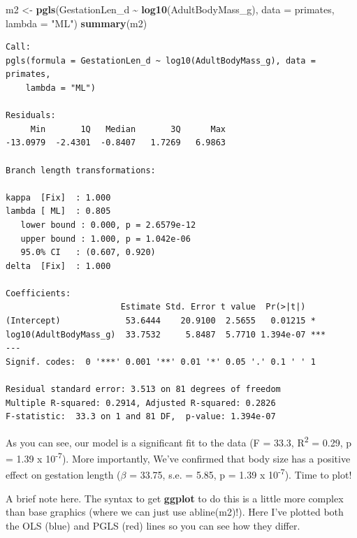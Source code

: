 \documentclass[
]{book}
\newenvironment{Shaded}{\begin{snugshade}}{\end{snugshade}}
\newcommand{\DataTypeTok}[1]{\textcolor[rgb]{0.13,0.29,0.53}{#1}}
\newcommand{\KeywordTok}[1]{\textcolor[rgb]{0.13,0.29,0.53}{\textbf{#1}}}
\newcommand{\NormalTok}[1]{#1}
\newcommand{\OperatorTok}[1]{\textcolor[rgb]{0.81,0.36,0.00}{\textbf{#1}}}
\newcommand{\StringTok}[1]{\textcolor[rgb]{0.31,0.60,0.02}{#1}}
\begin{document}
\begin{Shaded}
\begin{Highlighting}[]
\NormalTok{m2 \textless{}{-}}\StringTok{ }\KeywordTok{pgls}\NormalTok{(GestationLen\_d }\OperatorTok{\textasciitilde{}}\StringTok{ }\KeywordTok{log10}\NormalTok{(AdultBodyMass\_g), }\DataTypeTok{data =}\NormalTok{ primates, }\DataTypeTok{lambda =} \StringTok{"ML"}\NormalTok{)}
\KeywordTok{summary}\NormalTok{(m2)}
\end{Highlighting}
\end{Shaded}

\begin{verbatim}
Call:
pgls(formula = GestationLen_d ~ log10(AdultBodyMass_g), data = primates, 
    lambda = "ML")

Residuals:
     Min       1Q   Median       3Q      Max 
-13.0979  -2.4301  -0.8407   1.7269   6.9863 

Branch length transformations:

kappa  [Fix]  : 1.000
lambda [ ML]  : 0.805
   lower bound : 0.000, p = 2.6579e-12
   upper bound : 1.000, p = 1.042e-06
   95.0% CI   : (0.607, 0.920)
delta  [Fix]  : 1.000

Coefficients:
                       Estimate Std. Error t value  Pr(>|t|)    
(Intercept)             53.6444    20.9100  2.5655   0.01215 *  
log10(AdultBodyMass_g)  33.7532     5.8487  5.7710 1.394e-07 ***
---
Signif. codes:  0 '***' 0.001 '**' 0.01 '*' 0.05 '.' 0.1 ' ' 1

Residual standard error: 3.513 on 81 degrees of freedom
Multiple R-squared: 0.2914, Adjusted R-squared: 0.2826 
F-statistic:  33.3 on 1 and 81 DF,  p-value: 1.394e-07 
\end{verbatim}

As you can see, our model is a significant fit to the data (F = 33.3, R\textsuperscript{2} = 0.29, p = 1.39 x 10\textsuperscript{-7}). More importantly, We've confirmed that body size has a positive effect on gestation length (\(\beta\) = 33.75, s.e. = 5.85, p = 1.39 x 10\textsuperscript{-7}). Time to plot!

A brief note here. The syntax to get \textbf{ggplot} to do this is a little more complex than base graphics (where we can just use abline(m2)!). Here I've plotted both the OLS (blue) and PGLS (red) lines so you can see how they differ.
\end{document}
